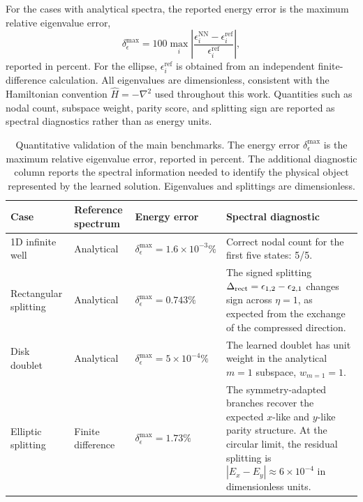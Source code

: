 \documentclass[10pt,onecolumn]{article}
\begin{document}
For the cases with analytical spectra, the reported energy error is the maximum relative eigenvalue error,
\begin{equation}
\delta_\epsilon^{\max}
=
100
\max_i
\left|
\frac{\epsilon_i^{\mathrm{NN}}-\epsilon_i^{\mathrm{ref}}}
{\epsilon_i^{\mathrm{ref}}}
\right|,
\end{equation}
reported in percent. For the ellipse, $\epsilon_i^{\mathrm{ref}}$ is obtained from an independent finite-difference calculation. All eigenvalues are dimensionless, consistent with the Hamiltonian convention $\hat{H}=-\nabla^2$ used throughout this work. Quantities such as nodal count, subspace weight, parity score, and splitting sign are reported as spectral diagnostics rather than as energy units.

\begin{table}[!htbp]
\centering
\caption{Quantitative validation of the main benchmarks. The energy error $\delta_\epsilon^{\max}$ is the maximum relative eigenvalue error, reported in percent. The additional diagnostic column reports the spectral information needed to identify the physical object represented by the learned solution. Eigenvalues and splittings are dimensionless.}
\label{tab:summary}
\small
\renewcommand{\arraystretch}{1.18}
\begin{tabularx}{\textwidth}{@{} l l l >{\raggedright\arraybackslash}X @{}}
\toprule
Case & Reference spectrum & Energy error & Spectral diagnostic \\
\midrule
1D infinite well
&
Analytical
&
$\delta_\epsilon^{\max}=1.6\times10^{-3}\%$
&
Correct nodal count for the first five states: 5/5. \\
Rectangular splitting
&
Analytical
&
$\delta_\epsilon^{\max}=0.743\%$
&
The signed splitting $\Delta_{\rm rect}=\epsilon_{1,2}-\epsilon_{2,1}$ changes sign across $\eta=1$, as expected from the exchange of the compressed direction. \\
Disk doublet
&
Analytical
&
$\delta_\epsilon^{\max}=5\times10^{-4}\%$
&
The learned doublet has unit weight in the analytical $m=1$ subspace, $w_{m=1}=1$. \\
Elliptic splitting
&
Finite difference
&
$\delta_\epsilon^{\max}=1.73\%$
&
The symmetry-adapted branches recover the expected $x$-like and $y$-like parity structure. At the circular limit, the residual splitting is $|E_x-E_y|\approx 6\times10^{-4}$ in dimensionless units. \\
\bottomrule
\end{tabularx}
\end{table}
\FloatBarrier
\end{document}
